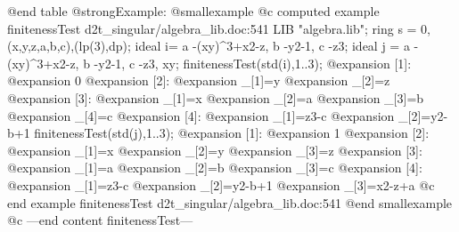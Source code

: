 @end table
@strong{Example:}
@smallexample
@c computed example finitenessTest d2t_singular/algebra_lib.doc:541 
LIB "algebra.lib";
ring s = 0,(x,y,z,a,b,c),(lp(3),dp);
ideal i= a -(xy)^3+x2-z, b -y2-1, c -z3;
ideal j = a -(xy)^3+x2-z, b -y2-1, c -z3, xy;
finitenessTest(std(i),1..3);
@expansion{} [1]:
@expansion{}    0
@expansion{} [2]:
@expansion{}    _[1]=y
@expansion{}    _[2]=z
@expansion{} [3]:
@expansion{}    _[1]=x
@expansion{}    _[2]=a
@expansion{}    _[3]=b
@expansion{}    _[4]=c
@expansion{} [4]:
@expansion{}    _[1]=z3-c
@expansion{}    _[2]=y2-b+1
finitenessTest(std(j),1..3);
@expansion{} [1]:
@expansion{}    1
@expansion{} [2]:
@expansion{}    _[1]=x
@expansion{}    _[2]=y
@expansion{}    _[3]=z
@expansion{} [3]:
@expansion{}    _[1]=a
@expansion{}    _[2]=b
@expansion{}    _[3]=c
@expansion{} [4]:
@expansion{}    _[1]=z3-c
@expansion{}    _[2]=y2-b+1
@expansion{}    _[3]=x2-z+a
@c end example finitenessTest d2t_singular/algebra_lib.doc:541
@end smallexample
@c ---end content finitenessTest---

